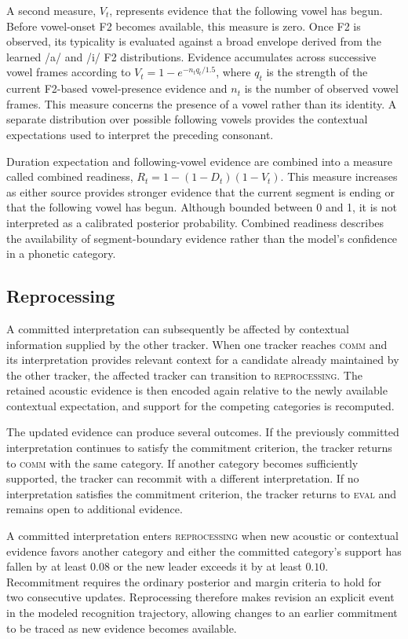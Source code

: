 \documentclass[12pt]{article}
\begin{document}
A second measure, $V_t$, represents evidence that the following vowel has begun.
%
Before vowel-onset F2 becomes available, this measure is zero.
%
Once F2 is observed, its typicality is evaluated against a broad envelope derived from the learned /a/ and /i/ F2 distributions.
%
Evidence accumulates across successive vowel frames according to $V_t = 1 - e^{-n_t q_t / 1.5}$, where $q_t$ is the strength of the current F2-based vowel-presence evidence and $n_t$ is the number of observed vowel frames.
%
This measure concerns the presence of a vowel rather than its identity.
%
A separate distribution over possible following vowels provides the contextual expectations used to interpret the preceding consonant.

Duration expectation and following-vowel evidence are combined into a measure called combined readiness, $R_t = 1 - (1-D_t)(1-V_t)$.
%
This measure increases as either source provides stronger evidence that the current segment is ending or that the following vowel has begun.
%
Although bounded between 0 and 1, it is not interpreted as a calibrated posterior probability.
%
Combined readiness describes the availability of segment-boundary evidence rather than the model's confidence in a phonetic category.

\subsection{Reprocessing}

A committed interpretation can subsequently be affected by contextual information supplied by the other tracker.
%
When one tracker reaches \textsc{comm} and its interpretation provides relevant context for a candidate already maintained by the other tracker, the affected tracker can transition to \textsc{reprocessing}.
%
The retained acoustic evidence is then encoded again relative to the newly available contextual expectation, and support for the competing categories is recomputed.

The updated evidence can produce several outcomes.
%
If the previously committed interpretation continues to satisfy the commitment criterion, the tracker returns to \textsc{comm} with the same category.
%
If another category becomes sufficiently supported, the tracker can recommit with a different interpretation.
%
If no interpretation satisfies the commitment criterion, the tracker returns to \textsc{eval} and remains open to additional evidence.

A committed interpretation enters \textsc{reprocessing} when new acoustic or contextual evidence favors another category and either the committed category's support has fallen by at least $0.08$ or the new leader exceeds it by at least $0.10$.
%
Recommitment requires the ordinary posterior and margin criteria to hold for two consecutive updates.
%
Reprocessing therefore makes revision an explicit event in the modeled recognition trajectory, allowing changes to an earlier commitment to be traced as new evidence becomes available.
\end{document}
